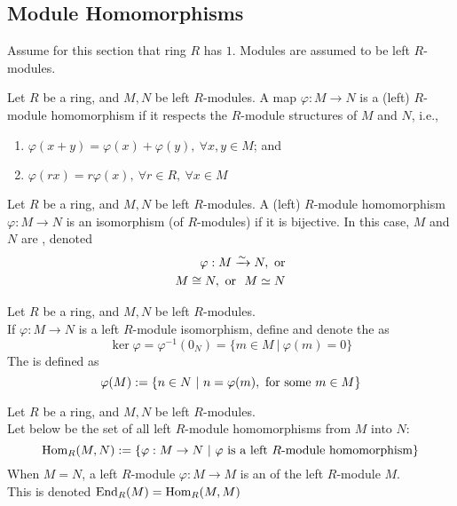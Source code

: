 \subsection{Module Homomorphisms}

Assume for this section that ring $R$ has $1$. Modules are assumed to be left $R$-modules.

\begin{definition}
Let $R$ be a ring, and $M, N$ be left $R$-modules. A map $\varphi: M \rightarrow N$ is a (left) $R$-module homomorphism if it respects the $R$-module structures of $M$ and $N$, i.e.,
\begin{enumerate}[label=(\roman*)]
\item $\varphi(x+y) = \varphi(x) + \varphi(y), \ \forall x,y \in M$; and
\item $\varphi(rx) = r \varphi(x), \ \forall r \in R, \ \forall x \in M$	
\end{enumerate}
\end{definition}

\begin{definition}
Let $R$ be a ring, and $M, N$ be left $R$-modules. A (left) $R$-module homomorphism $\varphi: M \rightarrow N$ is an isomorphism (of $R$-modules) if it is bijective. In this case, $M$ and $N$ are , denoted
\begin{align}
\varphi : M \xrightarrow{\sim} N, \textnormal{ or} \nonumber \\
M \cong N, \textnormal{ or } \ M \simeq N \nonumber
\end{align}
\end{definition}

\begin{definition}
Let $R$ be a ring, and $M, N$ be left $R$-modules.\\
If $\varphi: M \rightarrow N$ is a left $R$-module isomorphism, define and denote the  as
\begin{equation}
\ker \varphi = \varphi^{-1}(0_N) = \{m \in M \ | \ \varphi(m) = 0\} \nonumber
\end{equation}
The  is defined as
\begin{equation}
\varphi(M) := \{n \in N \ | \ n = \varphi(m), \textnormal{ for some } m \in M\} \nonumber
\end{equation}
\end{definition}

\begin{definition}
Let $R$ be a ring, and $M, N$ be left $R$-modules.\\
Let below be the set of all left $R$-module homomorphisms from $M$ into $N$:
\begin{equation}
\textnormal{Hom}_R (M,N) := \{\varphi: M \rightarrow N \ | \ \varphi \textnormal{ is a left $R$-module homomorphism}\} \nonumber
\end{equation}
When $M=N$, a left $R$-module $\varphi: M \rightarrow M$ is an  of the left $R$-module $M$.\\
This is denoted $\textnormal{End}_R (M) = \textnormal{Hom}_R(M,M)$
\end{definition}

